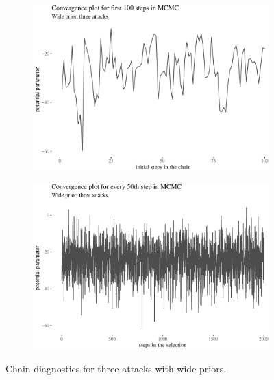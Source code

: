 \documentclass[10pt,]{scrartcl}
\begin{document}
\begin{figure}[!ht]
\begin{subfigure}[!ht]{0.45\textwidth}

\begin{center}\includegraphics[width=1\linewidth]{redditAnalysisWalkthrough_files/figure-latex/unnamed-chunk-53-1} \end{center}
\end{subfigure} \hfill
\begin{subfigure}[!ht]{0.45\textwidth}

\begin{center}\includegraphics[width=1\linewidth]{redditAnalysisWalkthrough_files/figure-latex/unnamed-chunk-54-1} \end{center}
\end{subfigure}
\caption{Chain diagnostics for three attacks with wide priors.}
\label{fig:chains}
\end{figure}
\end{document}
